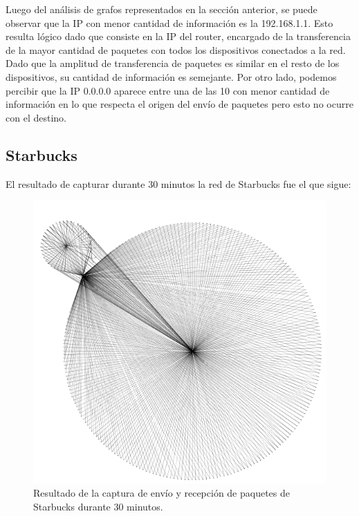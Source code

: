 \documentclass[10pt, a4paper]{article}
\begin{document}
Luego del análisis de grafos representados en la sección anterior, se puede observar que la IP con menor cantidad de información es la 192.168.1.1. Esto resulta lógico dado que consiste en la IP del router, encargado de la transferencia de la mayor cantidad de paquetes con todos los dispositivos conectados a la red. Dado que la amplitud de transferencia de paquetes es similar en el resto de los dispositivos, su cantidad de información es semejante.
Por otro lado, podemos percibir que la IP 0.0.0.0 aparece entre una de las 10 con menor cantidad de información en lo que respecta el origen del envío de paquetes pero esto no ocurre con el destino.

\subsection{Starbucks}

 El resultado de capturar durante 30 minutos la red de Starbucks fue el que sigue:

\begin{figure}[H] %
\begin{center}
\includegraphics[width=450pt]{../imgs/starbucks30_entero.png}
\caption{Resultado de la captura de envío y recepción de paquetes de Starbucks durante 30 minutos.}
\end{center}
\end{figure}
\end{document}
